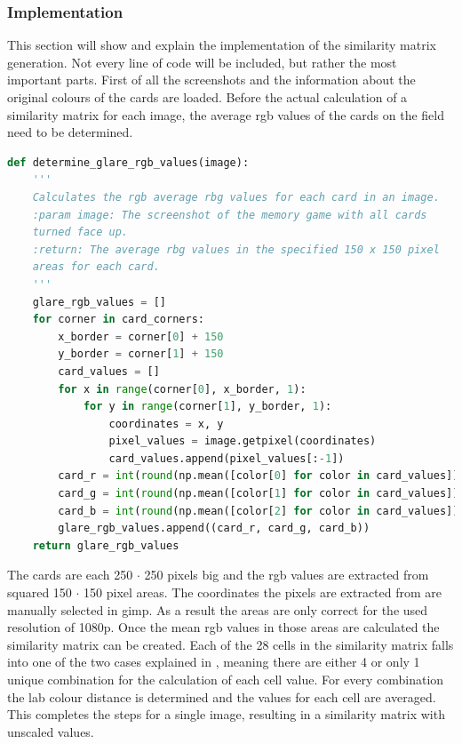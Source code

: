 \subsubsection{Implementation}
This section will show and explain the implementation of the similarity matrix generation. Not every line of code will be included, but rather the most important parts. First of all the screenshots and the information about the original colours of the cards are loaded. Before the actual calculation of a similarity matrix for each image, the average rgb values of the cards on the field need to be determined. 
\begin{lstlisting}[language=python, caption=Add caption]
def determine_glare_rgb_values(image):
	'''
	Calculates the rgb average rbg values for each card in an image.
	:param image: The screenshot of the memory game with all cards 
	turned face up.
	:return: The average rbg values in the specified 150 x 150 pixel 
	areas for each card. 
	'''
	glare_rgb_values = []
	for corner in card_corners:
		x_border = corner[0] + 150
		y_border = corner[1] + 150
		card_values = []
		for x in range(corner[0], x_border, 1):
			for y in range(corner[1], y_border, 1):
				coordinates = x, y
				pixel_values = image.getpixel(coordinates)
				card_values.append(pixel_values[:-1])
		card_r = int(round(np.mean([color[0] for color in card_values])))
		card_g = int(round(np.mean([color[1] for color in card_values])))
		card_b = int(round(np.mean([color[2] for color in card_values])))
		glare_rgb_values.append((card_r, card_g, card_b))
	return glare_rgb_values 
\end{lstlisting}
The cards are each 250 $\cdot$ 250 pixels big and the rgb values are extracted from squared 150 $\cdot$ 150 pixel areas. The coordinates the pixels are extracted from are manually selected in gimp. As a result the areas are only correct for the used resolution of 1080p. Once the mean rgb values in those areas are calculated the similarity matrix can be created. Each of the 28 cells in the similarity matrix falls into one of the two cases explained in , meaning there are either 4 or only 1 unique combination for the calculation of each cell value. For every combination the lab colour distance is determined and the values for each cell are averaged. This completes the steps for a single image, resulting in a similarity matrix with unscaled values. 
